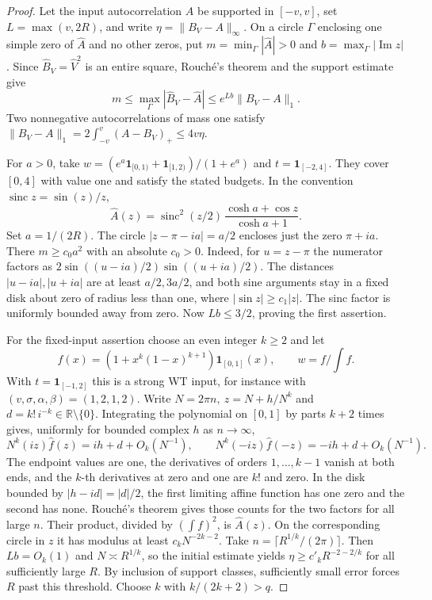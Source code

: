 \documentclass[11pt]{article}
\newcommand{\R}{\mathbb R}
\newcommand{\ind}{\mathbf1}
\newcommand{\norm}[1]{\lVert #1\rVert}
\begin{document}
\begin{proof}
Let the input autocorrelation \(A\) be supported in \([-v,v]\), set \(L=\max(v,2R)\), and write \(\eta=\norm{B_V-A}_\infty\). On a circle \(\Gamma\) enclosing one simple zero of \(\widehat A\) and no other zeros, put \(m=\min_\Gamma|\widehat A|>0\) and \(b=\max_\Gamma|\operatorname{Im}z|\). Since \(\widehat B_V=\widehat V^2\) is an entire square, Rouch\'e's theorem and the support estimate give
\[
 m\le\max_\Gamma|\widehat B_V-\widehat A|\le e^{Lb}\norm{B_V-A}_1 .
\]
Two nonnegative autocorrelations of mass one satisfy
\(\norm{B_V-A}_1=2\int_{-v}^{v}(A-B_V)_+\le4v\eta\).

For \(a>0\), take \(w=(e^a\ind_{[0,1)}+\ind_{[1,2)})/(1+e^a)\) and \(t=\ind_{[-2,4]}\). They cover \([0,4]\) with value one and satisfy the stated budgets. In the convention \(\operatorname{sinc}z=\sin(z)/z\),
\[
 \widehat A(z)=\operatorname{sinc}^2(z/2)\,\frac{\cosh a+\cos z}{\cosh a+1}.
\]
Set \(a=1/(2R)\). The circle \(|z-\pi-ia|=a/2\) encloses just the zero \(\pi+ia\). There \(m\ge c_0a^2\) with an absolute \(c_0>0\). Indeed, for \(u=z-\pi\) the numerator factors as \(2\sin((u-ia)/2)\sin((u+ia)/2)\). The distances \(|u-ia|,|u+ia|\) are at least \(a/2,3a/2\), and both sine arguments stay in a fixed disk about zero of radius less than one, where \(|\sin z|\ge c_1|z|\). The sinc factor is uniformly bounded away from zero. Now \(Lb\le3/2\), proving the first assertion.

For the fixed-input assertion choose an even integer \(k\ge2\) and let
\[
 f(x)=(1+x^k(1-x)^{k+1})\ind_{[0,1]}(x),\qquad w=f/\!\int f .
\]
With \(t=\ind_{[-1,2]}\) this is a strong WT input, for instance with \((v,\sigma,\alpha,\beta)=(1,2,1,2)\). Write \(N=2\pi n,\ z=N+h/N^k\) and \(d=k!\,i^{-k}\in\R\setminus\{0\}\). Integrating the polynomial on \([0,1]\) by parts \(k+2\) times gives, uniformly for bounded complex \(h\) as \(n\to\infty\),
\[
 N^k(iz)\widehat f(z)=ih+d+O_k(N^{-1}),\qquad
 N^k(-iz)\widehat f(-z)=-ih+d+O_k(N^{-1}).
\]
The endpoint values are one, the derivatives of orders \(1,\ldots,k-1\) vanish at both ends, and the \(k\)-th derivatives at zero and one are \(k!\) and zero. In the disk bounded by \(|h-id|=|d|/2\), the first limiting affine function has one zero and the second has none. Rouch\'e's theorem gives those counts for the two factors for all large \(n\). Their product, divided by \((\int f)^2\), is \(\widehat A(z)\). On the corresponding circle in \(z\) it has modulus at least \(c_k N^{-2k-2}\). Take \(n=\lceil R^{1/k}/(2\pi)\rceil\). Then \(Lb=O_k(1)\) and \(N\asymp R^{1/k}\), so the initial estimate yields \(\eta\ge c'_k R^{-2-2/k}\) for all sufficiently large \(R\). By inclusion of support classes, sufficiently small error forces \(R\) past this threshold. Choose \(k\) with \(k/(2k+2)>q\).
\end{proof}
\end{document}
